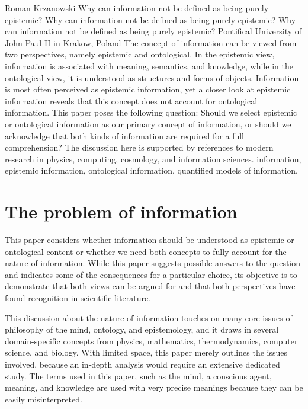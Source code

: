 \begin{artengenv}{Roman Krzanowski}
	{Why can information not be defined as being purely epistemic?}
	{Why can information not be defined as being purely epistemic?}
	{Why can information not be defined as being purely epistemic?}
	{Pontifical University of John Paul II in Krakow, Poland}
	{The concept of information can be viewed from two perspectives, namely epistemic and ontological. In the epistemic view, information is associated with meaning, semantics, and knowledge, while in the ontological view, it is understood as structures and forms of objects. Information is most often perceived as epistemic information, yet a closer look at epistemic information reveals that this concept does not account for ontological information. This paper poses the following question: Should we select epistemic or ontological information as our primary concept of information, or should we acknowledge that both kinds of information are required for a full comprehension? The discussion here is supported by references to modern research in physics, computing, cosmology, and information sciences.}
	{information, epistemic information, ontological information, quantified models of information.}




\section{The problem of information}
\enlargethispage{\baselineskip}
This paper considers whether information should be understood as epistemic or ontological content or whether we need both concepts to fully account for the nature of information. While this paper suggests possible answers to the question and indicates some of the consequences for a particular choice, its objective is to demonstrate that both views can be argued for and that both perspectives have found recognition in scientific literature.

This discussion about the nature of information touches on many core issues of philosophy of the mind, ontology, and epistemology, and it draws in several domain-specific concepts from physics, mathematics, thermodynamics, computer science, and biology. With limited space, this paper merely outlines the issues involved, because an in-depth analysis would require an extensive dedicated study. The terms used in this paper, such as the mind, a conscious agent, meaning, and knowledge are used with very precise meanings because they can be easily misinterpreted.


\end{artengenv}
